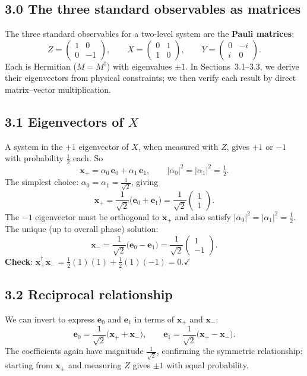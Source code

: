 \documentclass[12pt,a4paper]{article}
\begin{document}
\subsection{3.0 The three standard observables as matrices}
The three standard observables for a two-level system are the \textbf{Pauli matrices}:
\[
    Z = \begin{pmatrix}1&0\\0&-1\end{pmatrix}, \qquad
    X = \begin{pmatrix}0&1\\1&0\end{pmatrix}, \qquad
    Y = \begin{pmatrix}0&-i\\i&0\end{pmatrix}.
\]
Each is Hermitian ($M = M^\dagger$) with eigenvalues $\pm 1$.  In Sections~3.1--3.3, we derive their eigenvectors from physical constraints; we then verify each result by direct matrix--vector multiplication.

\subsection{3.1 Eigenvectors of $X$}
A system in the $+1$ eigenvector of $X$, when measured with $Z$, gives $+1$ or $-1$ with probability $\tfrac{1}{2}$ each.  So
\[
    \mathbf{x}_+ = \alpha_0\,\mathbf{e}_0+\alpha_1\,\mathbf{e}_1, \qquad
    |\alpha_0|^2 = |\alpha_1|^2 = \tfrac{1}{2}.
\]
The simplest choice: $\alpha_0=\alpha_1=\frac{1}{\sqrt{2}}$, giving
\[
    \mathbf{x}_+ = \frac{1}{\sqrt{2}}\bigl(\mathbf{e}_0+\mathbf{e}_1\bigr) = \frac{1}{\sqrt{2}}\begin{pmatrix}1\\1\end{pmatrix}.
\]
The $-1$ eigenvector must be orthogonal to $\mathbf{x}_+$ and also satisfy $|\alpha_0|^2=|\alpha_1|^2=\tfrac{1}{2}$.  The unique (up to overall phase) solution:
\[
    \mathbf{x}_- = \frac{1}{\sqrt{2}}\bigl(\mathbf{e}_0-\mathbf{e}_1\bigr) = \frac{1}{\sqrt{2}}\begin{pmatrix}1\\-1\end{pmatrix}.
\]
\textbf{Check}: $\mathbf{x}_+^\dagger\mathbf{x}_-=\frac{1}{2}(1)(1)+\frac{1}{2}(1)(-1)=0$.\;$\checkmark$

\subsection{3.2 Reciprocal relationship}
We can invert to express $\mathbf{e}_0$ and $\mathbf{e}_1$ in terms of $\mathbf{x}_+$ and $\mathbf{x}_-$:
\[
    \mathbf{e}_0 = \frac{1}{\sqrt{2}}\bigl(\mathbf{x}_++\mathbf{x}_-\bigr), \qquad
    \mathbf{e}_1 = \frac{1}{\sqrt{2}}\bigl(\mathbf{x}_+-\mathbf{x}_-\bigr).
\]
The coefficients again have magnitude $\frac{1}{\sqrt{2}}$, confirming the symmetric relationship: starting from $\mathbf{x}_\pm$ and measuring $Z$ gives $\pm 1$ with equal probability.
\end{document}
